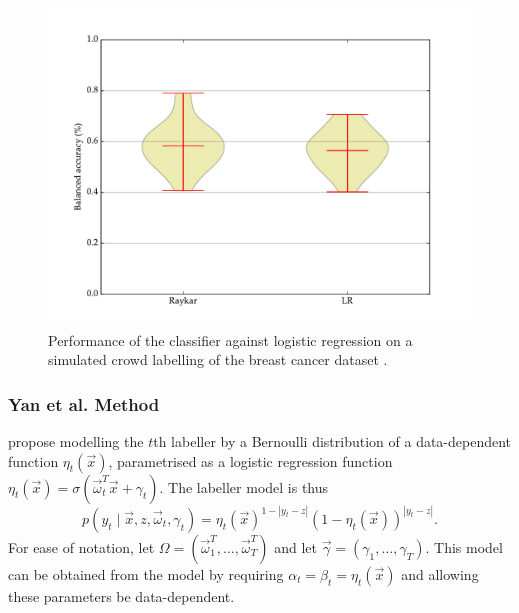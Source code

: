             \begin{figure}[!ht]
                \centering
                \includegraphics[width=\textwidth]{images/experiments/raykar.pdf}
                \caption{Performance of the \citeauthor{raykar10} classifier against logistic regression on a simulated crowd labelling of the breast cancer dataset \citep{wolberg90}.}
                \label{fig:raykar}
            \end{figure}

        \subsubsection{Yan et al. Method}
            \label{sec:yan}

            \citet{yan10} propose modelling the $t$th labeller by a Bernoulli distribution of a data-dependent function $\eta_t(\vec x)$, parametrised as a logistic regression function $\eta_t(\vec x) = \sigma(\vec \omega_t^T \vec x + \gamma_t)$. The labeller model is thus
            \begin{equation*}
                p(y_t \mid \vec x, z, \vec \omega_t, \gamma_t) = \eta_t(\vec x)^{1 - |y_t - z|} (1 - \eta_t(\vec x))^{|y_t - z|}.
            \end{equation*}
            For ease of notation, let $\Omega = (\vec \omega_1^T, \dots, \vec \omega_T^T)$ and let $\vec \gamma = (\gamma_1, \dots, \gamma_T)$. This model can be obtained from the \citeauthor{raykar10} model by requiring $\alpha_t = \beta_t = \eta_t(\vec x)$ and allowing these parameters be data-dependent.

